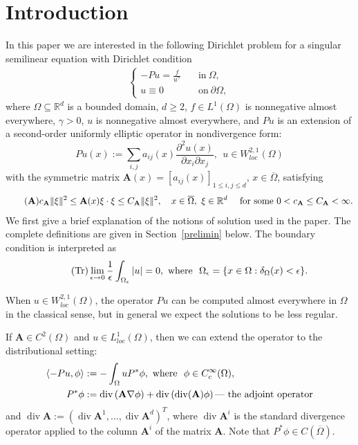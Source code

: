 \documentclass[12pt,a4paper]{amsart}
\theoremstyle{definition}
\newcommand{\R}{\mathbb{R}}
\newcommand{\A}{\mathbf{A}}
\newcommand*\Div{\operatorname{div}}
\begin{document}
\section{Introduction}
In this paper
we are interested in the following Dirichlet problem for a singular semilinear equation with Dirichlet condition
\begin{align}\label{pe}
   \begin{cases} -Pu = \displaystyle\frac{f}{u^\gamma}\quad &\text{in}\ \Omega,\\
   u \equiv 0\quad &\text{on}\ \partial \Omega, 
   \end{cases}
\end{align}
where $\Omega\subseteq\R^d$  is a bounded domain,  $d\geq 2$, 
$f\in L^1(\Omega)$ is nonnegative almost everywhere,  $\gamma>0$, $u$
is nonnegative almost everywhere, and $Pu$ is
an extension of
a second-order uniformly elliptic operator in nondivergence form:
\begin{equation}\label{eq:P}\tag{$P$}
Pu(x) := \sum_{i,j}a_{ij}(x)\frac{\partial^2 u(x)}{\partial x_i\partial x_j}, \ \ u\in W^{2,1}_{loc}(\Omega)
\end{equation}
with the symmetric matrix $\A(x) = [a_{ij}(x)]_{1\leq i,j\leq d}$, $x\in \overline{\Omega}$, satisfying 
\begin{align} \tag{$\A$} \label{ellipticity}
 c_{\A}\|\xi\|^2 \le \A(x)\xi \cdot \xi \le C_{\A} \|\xi\|^2,\quad x\in \overline{\Omega},\ \xi\in \R^d \quad \text{ for some } 0< c_{\A} \leq C_{\A} <\infty.
\end{align}
We first give a brief explanation of the notions of solution used in the paper. The complete definitions are given in Section~\ref{prelimin} below.  
The boundary condition is interpreted as 
 \begin{align}\tag{Tr}
 \label{eq:Dirichletcond}
        \lim\limits_{\epsilon\to 0}\frac 1 \epsilon \int_{\Omega_\epsilon} |u| = 0, \ {\rm where} \ \ \Omega_\epsilon = \{x\in \Omega: \delta_\Omega(x) < \epsilon\}.
\end{align}


 When $u\in W^{2,1}_{loc}(\Omega)$, the operator $Pu$ can be computed almost everywhere in $\Omega$ in the classical sense, but in general we expect the solutions to be less regular.

If $\A\in C^2(\Omega)$ and $u\in L^1_{loc}(\Omega)$, then we can extend the operator to the distributional setting:
\begin{align}
  \langle -Pu,\phi    \rangle &:= 
-\int_\Omega u P^*\phi,\ {\rm where} \ \ \phi \in C^\infty_c(\Omega),\label{P-distr}\\
P^*\phi&:=  \Div\left( \A\nabla \phi \right) + \Div\left(\Div(\A)\phi  \right) \hbox{\rm --- the adjoint operator}\label{P-star}
\end{align}
and $\Div\A:= (\Div \A^1,\dots , \Div\A^d)^T$, where $\operatorname{div} \mathbf{A}^i$ is the standard divergence operator applied to the column $\A^i$  of the matrix $\A$. 
Note that $P^*\phi\in C(\overline{\Omega})$. 
\end{document}
